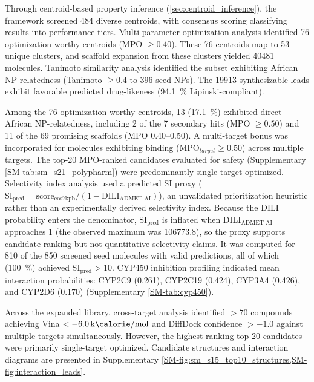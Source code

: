 \documentclass[journal=jcisd8,manuscript=article]{achemso}
\begin{document}
Through centroid-based property inference (\cref{sec:centroid_inference}), the framework screened \num{484} diverse centroids, with consensus scoring
classifying results into performance tiers. Multi-parameter optimization analysis identified \num{76} optimization-worthy centroids (MPO $\geq \num{0.40}$).
These \num{76} centroids map to \num{53} unique clusters, and scaffold expansion from these clusters yielded \num{40481} molecules. Tanimoto similarity
analysis identified the subset exhibiting African NP-relatedness (Tanimoto $\geq \num{0.4}$ to \num{396} seed NPs). The \num{19913} synthesizable leads exhibit
favorable predicted drug-likeness (\qty{94.1}{\percent} Lipinski-compliant).

Among the \num{76} optimization-worthy centroids, \num{13} (\qty{17.1}{\percent}) exhibited direct African NP-relatedness, including \num{2} of the \num{7}
secondary hits (MPO $\geq \num{0.50}$) and \num{11} of the \num{69} promising scaffolds (MPO \numrange{0.40}{0.50}). A multi-target bonus was incorporated for
molecules exhibiting binding ($\text{MPO}_{target} \geq \num{0.50}$) across multiple targets. The top-20 MPO-ranked candidates evaluated for safety
(Supplementary \cref{SM-tab:sm_s21_polypharm}) were predominantly single-target optimized. Selectivity index analysis used a predicted SI proxy
($\text{SI}_{\text{pred}} = \text{score}_{\text{eos7kpb}} / (1 - \text{DILI}_{\text{ADMET-AI}})$), an unvalidated prioritization heuristic rather than an
experimentally derived selectivity index. Because the DILI probability enters the denominator, $\text{SI}_{\text{pred}}$ is inflated when
$\text{DILI}_{\text{ADMET-AI}}$ approaches 1 (the observed maximum was \num{106773.8}), so the proxy supports candidate ranking but not quantitative
selectivity claims. It was computed for \num{810} of the \num{850} screened seed molecules with valid predictions, all of which (\qty{100}{\percent}) achieved
$\text{SI}_{\text{pred}} > \num{10}$. CYP450 inhibition profiling indicated mean interaction probabilities: CYP2C9 (\num{0.261}), CYP2C19 (\num{0.424}), CYP3A4
(\num{0.426}), and CYP2D6 (\num{0.170}) (Supplementary \cref{SM-tab:cyp450}).

Across the expanded library, cross-target analysis identified $ > \num{70}$ compounds achieving Vina $< \qty{-6.0}{\kilo\calorie\per\mole}$ and DiffDock
confidence $> \num{-1.0}$ against multiple targets simultaneously. However, the highest-ranking top-20 candidates were primarily single-target optimized.
Candidate structures and interaction diagrams are presented in Supplementary \cref{SM-fig:sm_s15_top10_structures,SM-fig:interaction_leads}.
\end{document}
